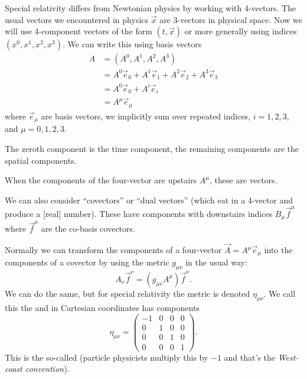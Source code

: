  Special relativity differs from Newtonian physics by
working with 4-vectors. The usual vectors we encountered in physics
$\vec{x}$ are 3-vectors in physical space. Now we will use 4-component
vectors of the form $(t, \vec{x})$ or more generally using indices
$(x^{0}, x^{1}, x^{2}, x^{3})$. We can write this using basis vectors
\begin{subequations}
\begin{align}
  A &= (A^{0}, A^{1}, A^{2}, A^{3})\\
&= A^{0}\vec{e}_{0} + A^{1}\vec{e}_{1} + A^{2}\vec{e}_{2} + A^{3}\vec{e}_{3}\\
&= A^{0}\vec{e}_{0} + A^{i}\vec{e}_{i}\\
&= A^{\mu}\vec{e}_{\mu}
\end{align}
\end{subequations}
where $\vec{e}_{\mu}$ are basis vectors, we implicitly sum over repeated
indices, $i = 1,2,3$, and $\mu=0,1,2,3$.

The zeroth component is the time component, the remaining components are
the spatial components.

\begin{remark}
When the components of the four-vector are upstairs $A^{\mu}$,
these are  vectors.
\end{remark}

We can also consider ``covectors'' or ``dual vectors'' (which eat in a
4-vector and produce a [real] number). These have components with
downstairs indices $B_{\mu}\vec{f}^{\mu}$ where $\vec{f}^{\mu}$ are the
co-basis covectors.

\M
Normally we can transform the components of a four-vector
$\vec{A}=A^{\mu}\vec{e}_{\mu}$ into the components of a covector by
using the metric $g_{\mu\nu}$ in the usual way:
\begin{equation}
A_{\nu}\vec{f}^{\nu} = (g_{\mu\nu}A^{\mu})\vec{f}^{\nu}.
\end{equation}
We can do the same, but for special relativity the metric is denoted
$\eta_{\mu\nu}$.
We call this the  and in Cartesian coordinates
has components
\begin{equation}
\eta_{\mu\nu} = \begin{pmatrix}-1 & 0 & 0 & 0\\
0 & 1 & 0 & 0\\
0 & 0 & 1 & 0\\
0 & 0 & 0 & 1
\end{pmatrix}.
\end{equation}
This is the so-called  (particle
physicists multiply this by $-1$ and that's the \emph{West-coast convention}).

